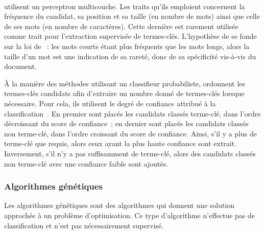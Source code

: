         ~\\ utilisent un perceptron
        multicouche. Les traits qu'ils emploient concer\-nent la fréquence du
        candidat, sa position et sa taille (en nombre de mots) ainsi que celle
        de ses mots (en nombre de caractères). Cette dernière est rarement
        utilisée comme trait pour l'extraction supervisée de termes-clés.
        L'hypothèse de  se fonde sur la loi de
        ~: les mots courts étant plus fréquents que les
        mots longs, alors la taille d'un mot est une indication de sa rareté,
        donc de sa spécificité vis-à-vis du document.
        
        À la manière des méthodes utilisant un classifieur probabiliste,
         ordonnent les termes-clés candidats
        afin d'extraire un nombre donné de termes-clés lorsque nécessaire. Pour
        cela, ils utilisent le degré de confiance attribué à la
        classification~\cite{denker1991neuralnetprobability}. En premier sont
        placés les candidats classés \og{}terme-clé\fg{}, dans l'ordre
        décroissant du score de confiance~; en dernier sont placés les candidats
        classés \og{}non terme-clé\fg{}, dans l'ordre croissant du score
        de confiance. Ainsi, s'il y a plus de \og{}terme-clé\fg{} que requis,
        alors ceux ayant la plus haute confiance sont extrait. Inversement, s'il
        n'y a pas suffisamment de \og{}terme-clé\fg{}, alors des candidats
        classés \og{}non terme-clé\fg{} avec une confiance faible sont ajoutés.

      \subsubsection{Algorithmes génétiques}
      \label{subsubsec:main-state_of_the_art-automatic_keyphrase_extraction-supervised_keyphrase_extraction-genex}
        Les algorithmes génétiques sont des algorithmes qui donnent une solution
        approchée à un problème d'optimisation. Ce type d'algorithme
        n'effectue pas de classification et n'est pas nécessairement supervisé.


